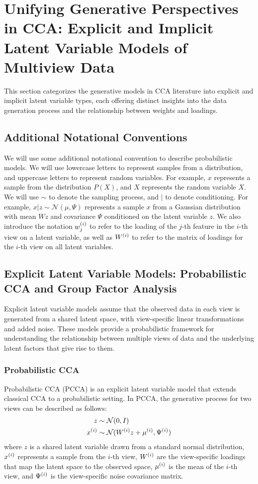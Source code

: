 \section{Unifying Generative Perspectives in CCA: Explicit and Implicit Latent Variable Models of Multiview Data}

This section categorizes the generative models in CCA literature into explicit and implicit latent variable types, each offering distinct insights into the data generation process and the relationship between weights and loadings.

\subsection{Additional Notational Conventions}

We will use some additional notational convention to describe probabilistic models.
We will use lowercase letters to represent samples from a distribution, and uppercase letters to represent random variables.
For example, \(x\) represents a sample from the distribution \(P(X)\), and \(X\) represents the random variable \(X\).
We will use $\sim$ to denote the sampling process, and $|$ to denote conditioning.
For example, \(x | z \sim \mathcal{N}(\mu, \Psi)\) represents a sample \(x\) from a Gaussian distribution with mean \(Wz\) and covariance \(\Psi\) conditioned on the latent variable \(z\).
We also introduce the notation \(w^{(i)}_{j}\) to refer to the loading of the \(j\)-th feature in the \(i\)-th view on a latent variable, as well as \(W^{(i)}\) to refer to the matrix of loadings for the \(i\)-th view on all latent variables.

\subsection{Explicit Latent Variable Models: Probabilistic CCA and Group Factor Analysis}

Explicit latent variable models assume that the observed data in each view is generated from a shared latent space, with view-specific linear transformations and added noise. These models provide a probabilistic framework for understanding the relationship between multiple views of data and the underlying latent factors that give rise to them.

\subsubsection{Probabilistic CCA}
Probabilistic CCA (PCCA) is an explicit latent variable model that extends classical CCA to a probabilistic setting. In PCCA, the generative process for two views can be described as follows:
\begin{align}
z &\sim \mathcal{N}(0, I)\\
x^{(i)} &\sim \mathcal{N}(W^{(i)} z + \mu^{(i)}, \Psi^{(i)})
\end{align}
where $z$ is a shared latent variable drawn from a standard normal distribution, $x^{(i)}$ represents a sample from the $i$-th view, $W^{(i)}$ are the view-specific loadings that map the latent space to the observed space, $\mu^{(i)}$ is the mean of the $i$-th view, and $\Psi^{(i)}$ is the view-specific noise covariance matrix.

